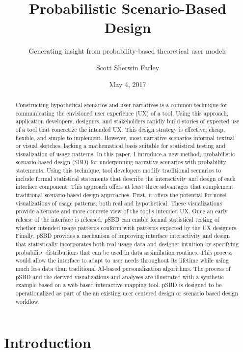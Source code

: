 \documentclass[]{article}
\title{Probabilistic Scenario-Based Design}
\subtitle{Generating insight from probability-based theoretical user models}
\author{Scott Sherwin Farley}
\date{May 4, 2017}
\begin{document}
\maketitle
\begin{abstract}
Constructing hypothetical scenarios and user narratives is a common
technique for communicating the envisioned user experience (UX) of a
tool. Using this approach, application developers, designers, and
stakeholders rapidly build stories of expected use of a tool that
concretize the intended UX. This design strategy is effective, cheap,
flexible, and simple to implement. However, most narrative scenarios
informal textual or visual sketches, lacking a mathematical basis
suitable for statistical testing and visualization of usage patterns. In
this paper, I introduce a new method, probabilistic scenario-based
design (SBD) for underpinning narrative scenarios with probability
statements. Using this technique, tool developers modify traditional
scenarios to include formal statistical statements that describe the
interactivity and design of each interface component. This approach
offers at least three advantages that complement traditional
scenario-based design approaches. First, it offers the potential for
novel visualizations of usage patterns, both real and hypothetical.
These visualizations provide alternate and more concrete view of the
tool's intended UX. Once an early release of the interface is released,
pSBD can enable formal statistical testing of whether intended usage
patterns conform with patterns expected by the UX designers. Finally,
pSBD provides a mechanism of improving interface interactivity and
design that statistically incorporates both real usage data and designer
intuition by specifying probability distributions that can be used in
data assimilation routines. This process would allow the interface to
adapt to user needs throughout its lifetime while using much less data
than traditional AI-based personalization algorithms. The process of
pSBD and the derived visualizations and analyses are illustrated with a
synthetic example based on a web-based interactive mapping tool. pSBD is
designed to be operationalized as part of the an existing ucer centered
design or scenario based design workflow.
\end{abstract}

{
\setcounter{tocdepth}{3}
\tableofcontents
}
\section{Introduction}\label{introduction}
\end{document}
